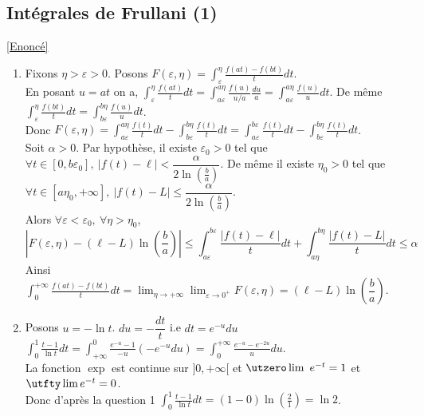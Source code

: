 \documentclass{book}
\begin{document}
	\subsection{Intégrales de Frullani (1) }
	\label{Intégrales de Frullani (1) corrigé}
	\textcolor{blue}{\hyperref[Intégrales de Frullani (1)]{[Enoncé]}}\\
	\begin{enumerate}
		\item Fixons $\eta>\varepsilon>0$. Posons $F(\varepsilon,\eta)=\displaystyle\int_\varepsilon^{\eta}\frac{f(at)-f(bt)}{t}dt$.\\
		En posant $u=at$ on a, $\displaystyle\int_\varepsilon^{\eta}\frac{f(at)}{t}dt=\int_{a\varepsilon}^{a\eta}\frac{f(u)}{u/a}\frac{du}{a}=\int_{a\varepsilon}^{a\eta}\frac{f(u)}{u}dt$. De même $\displaystyle\int_\varepsilon^\eta\frac{f(bt)}{t}dt=\int_{b\varepsilon}^{b\eta}\frac{f(u)}{u}dt$.\\
		Donc $F(\varepsilon,\eta)=\displaystyle\int_{a\varepsilon}^{a\eta}\frac{f(t)}{t}dt-\int_{b\varepsilon}^{b\eta}\frac{f(t)}{t}dt=\int_{a\varepsilon}^{b\varepsilon}\frac{f(t)}{t}dt-\int_{b\varepsilon}^{b\eta}\frac{f(t)}{t}dt$.\\
		Soit $\alpha>0$. Par hypothèse, il existe $\varepsilon_0>0$ tel que $\forall t\in [0,b\varepsilon_0],\ |f(t)-\ell|<\dfrac{\alpha}{2\ln\left(\frac{b}{a}\right)}$. De même il existe $\eta_0>0$ tel que $\forall t\in [a\eta_0,+\infty],\ |f(t)-L|\leq \dfrac{\alpha}{2\ln\left(\frac{b}{a}\right)}$.\\
		Alors $\forall \varepsilon<\varepsilon_0,\ \forall \eta>\eta_0$, $$\left|F(\varepsilon,\eta)-(\ell-L)\ln\left(\frac{b}{a}\right)\right|\leq\int_{a\varepsilon}^{b\varepsilon}\frac{|f(t)-\ell|}{t}dt+\int_{a\eta}^{b\eta}\frac{|f(t)-L|}{t}dt\leq \alpha$$
		Ainsi $\displaystyle\int_0^{+\infty}\frac{f(at)-f(bt)}{t}dt=\lim_{\eta\to +\infty}\lim_{\varepsilon\to 0^+}F(\varepsilon,\eta)=(\ell-L)\ln\left(\dfrac{b}{a}\right)$.
		\item Posons $u=-\ln t$. $du=-\dfrac{dt}{t}$ i.e $dt=e^{-u}du$\\
		$\displaystyle\int_0^1\frac{t-1}{\ln t}dt=\int_{+\infty}^0\frac{e^{-u}-1}{-u}(-e^{-u}du)=\int_0^{+\infty}\frac{e^{-u}-e^{-2u}}{u}du$.\\
		La fonction $\exp$ est continue sur $]0,+\infty[$ et $\utzero\lim\ e^{-t}=1$ et $\utfty\lim e^{-t}=0$.\\
		Donc d'après la question 1 $\displaystyle\int_0^1\frac{t-1}{\ln t}dt=(1-0)\ln\left(\frac{2}{1}\right)=\ln 2$.
	\end{enumerate}
	
\end{document}
